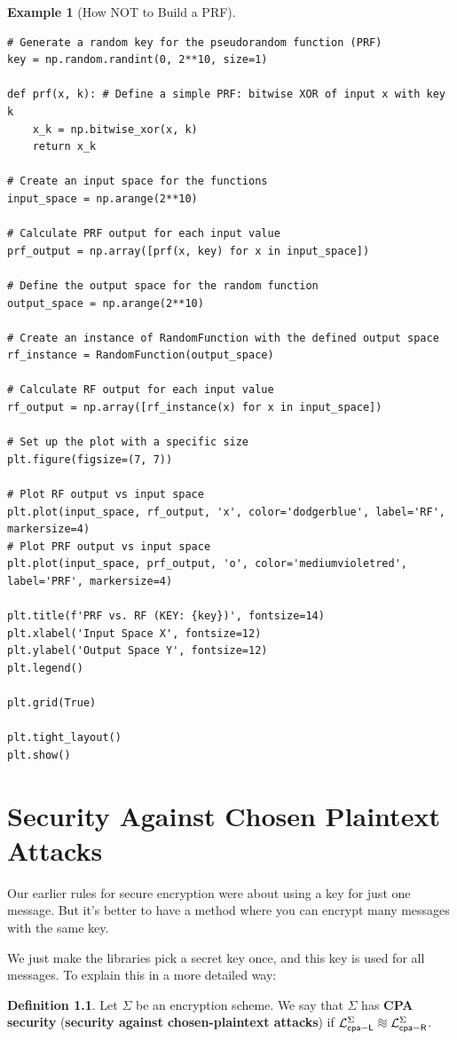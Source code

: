 \documentclass[12pt,openany]{book}
\theoremstyle{definition}
\newtheorem{definition}{Definition}[chapter]
\newtheorem{example}{Example}[chapter]
\newcommand{\library}{\mathcal{L}}
\newcommand*{\indist}{%
	\mathrel{\vcenter{\offinterlineskip
			\hbox{$\sim$}\vskip-.35ex\hbox{$\sim$}\vskip-.35ex\hbox{$\sim$}}}}
\begin{document}
\begin{example}[How NOT to Build a PRF]
\begin{lstlisting}[style=sage]
# Generate a random key for the pseudorandom function (PRF)
key = np.random.randint(0, 2**10, size=1)

def prf(x, k): # Define a simple PRF: bitwise XOR of input x with key k
	x_k = np.bitwise_xor(x, k)
	return x_k

# Create an input space for the functions
input_space = np.arange(2**10)

# Calculate PRF output for each input value
prf_output = np.array([prf(x, key) for x in input_space])

# Define the output space for the random function
output_space = np.arange(2**10)

# Create an instance of RandomFunction with the defined output space
rf_instance = RandomFunction(output_space)

# Calculate RF output for each input value
rf_output = np.array([rf_instance(x) for x in input_space])

# Set up the plot with a specific size
plt.figure(figsize=(7, 7))

# Plot RF output vs input space
plt.plot(input_space, rf_output, 'x', color='dodgerblue', label='RF', markersize=4)
# Plot PRF output vs input space
plt.plot(input_space, prf_output, 'o', color='mediumvioletred', label='PRF', markersize=4)

plt.title(f'PRF vs. RF (KEY: {key})', fontsize=14)
plt.xlabel('Input Space X', fontsize=12)
plt.ylabel('Output Space Y', fontsize=12)
plt.legend()

plt.grid(True)

plt.tight_layout()
plt.show()
	\end{lstlisting}
\end{example}

	\newpage
	\chapter{Security Against Chosen Plaintext Attacks}
	
	Our earlier rules for secure encryption were about using a key for just one message. But it's better to have a method where you can encrypt many messages with the same key.\par
	We just make the libraries pick a secret key once, and this key is used for all messages. To explain this in a more detailed way:
	\vspace{12pt}
	\begin{tcolorbox}[colback=white,colframe=defcolor,arc=5pt,title={\color{white}\bf CPA security}]
		\begin{definition}
			Let $\Sigma$ be an encryption scheme. We say that $\Sigma$ has \textbf{CPA security} (\textbf{security against chosen-plaintext attacks}) if $\library_{\mathsf{cpa-L}}^\Sigma\indist\library_{\mathsf{cpa-R}}^\Sigma$.
		\end{definition}
	\end{tcolorbox}
	
\end{document}
